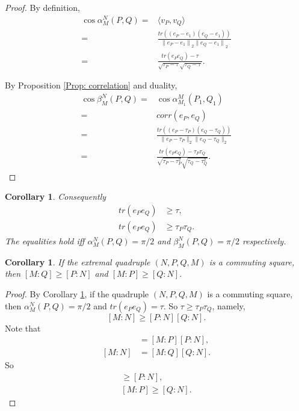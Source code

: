 \documentclass[11pt,letterpaper]{amsart}
\newtheorem{corollary}[theorem]{Corollary}
\theoremstyle{definition}
\theoremstyle{remark}
\begin{document}
\begin{proof}
By definition, 
\begin{align*}
\cos \alpha^N_M(P, Q) 
=&\langle v_P,v_Q\rangle \\
=& \frac{tr((e_P-e_1)(e_Q-e_1))}{{\lVert e_P-e_1\rVert}_2{\lVert e_Q-e_1\rVert}_2} \\
=&\frac{tr(e_Pe_Q)-\tau}{\sqrt{\tau_P-\tau}\sqrt{\tau_Q-\tau}}.
\end{align*}

By Proposition \ref{Prop: correlation} and duality,
\begin{align*}
\cos \beta^N_M(P, Q) 
=& \cos \alpha^M_{M_1}(P_1, Q_1)\\ 
=& corr(e_{P}, e_{Q})  \\
=&\frac{tr((e_P-\tau_P)(e_Q-\tau_Q))}{\|e_P-\tau_P\|_2\|e_Q-\tau_Q\|_2} \\
=& \frac{tr(e_Pe_Q)-\tau_P\tau_Q}{\sqrt{\tau_P-\tau_P^2}\sqrt{\tau_Q-\tau_Q^2}}.
\end{align*}

\end{proof}

\begin{corollary}\label{Cor:123}
Consequently 
\begin{align*}
 tr(e_Pe_Q) &\geq \tau, \\
 tr(e_Pe_Q) &\geq \tau_P\tau_Q.
\end{align*}
The equalities hold iff $\alpha^N_M(P,Q)=\pi/2$ and $\beta^N_M(P,Q)=\pi/2$ respectively.
\end{corollary}

\begin{corollary}\label{geq}
If the extremal quadruple $(N,P,Q,M)$ is a commuting square, then 
$[M:Q]\geq [P:N]$ and $[M:P] \geq [Q:N]$.
\end{corollary}


\begin{proof}
By Corollary \ref{Cor:123}, if the  quadruple $(N,P,Q,M)$ is a commuting square, then $\alpha^N_M(P,Q)=\pi/2$ and $tr(e_Pe_Q)=\tau$. So
$\tau \geq \tau_P\tau_Q$,
namely,
$$[M:N]\geq [P:N][Q:N].$$
Note that 
\begin{align*}
[M:N]&= [M:P][P:N],\\
[M:N]&= [M:Q][Q:N].
\end{align*} 
So 
\begin{align*}
[M:Q] \geq [P:N], \\
[M:P] \geq [Q:N].
\end{align*}
\end{proof}
\end{document}
